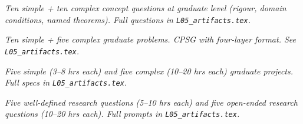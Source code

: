 \begin{tcolorbox}[gradconceptbox, title={SCQG + CCQG · L05 · Tiers 4–5}]
\textit{Ten simple + ten complex concept questions at graduate level (rigour, domain
conditions, named theorems). Full questions in \texttt{L05_artifacts.tex}.}
\end{tcolorbox}

\begin{tcolorbox}[gradprobbox, title={SPSG + CPSG · L05 · Tiers 4–5}]
\textit{Ten simple + five complex graduate problems.
CPSG with four-layer format. See \texttt{L05_artifacts.tex}.}
\end{tcolorbox}

\begin{tcolorbox}[gradprobbox, title={SPJG (×5) + CPJG (×5) · L05 · Tiers 4–5}]
\textit{Five simple (3–8 hrs each) and five complex (10–20 hrs each) graduate projects.
Full specs in \texttt{L05_artifacts.tex}.}
\end{tcolorbox}

\begin{tcolorbox}[researchbox, title={WRQ (×5) + ORQ (×5) · L05 · Tiers 4–5}]
\textit{Five well-defined research questions (5–10 hrs each) and five open-ended
research questions (10–20 hrs each). Full prompts in \texttt{L05_artifacts.tex}.}
\end{tcolorbox}
